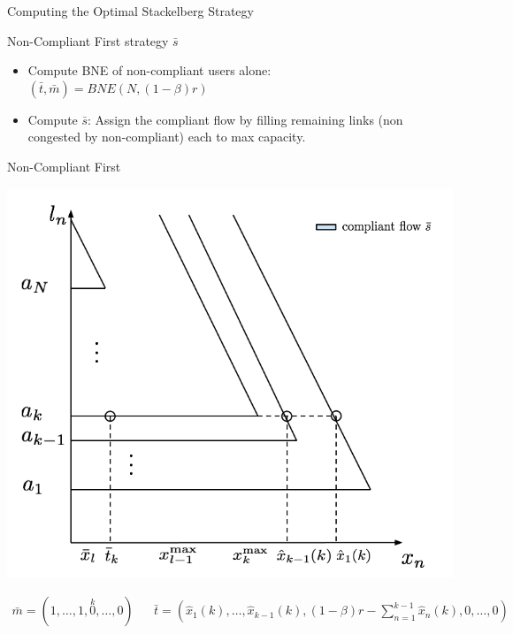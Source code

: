 \documentclass[english, smaller]{beamer}
\theoremstyle{plain}
\theoremstyle{definition}
\theoremstyle{plain}
\theoremstyle{plain}
\begin{document}
\begin{frame}{Computing the Optimal Stackelberg Strategy}

\begin{block}{Non-Compliant First strategy $\bar{s}$}
\begin{itemize}
\item \alert{Compute BNE of non-compliant users alone: $(\bar{t}, \bar{m}) = BNE(N, (1-\beta)r)$}
\item Compute $\bar{s}$: Assign the compliant flow by filling remaining links (non congested by non-compliant) each to max capacity.
\end{itemize}
\end{block}

\end{frame}



\begin{frame}{Non-Compliant First}

\begin{center}
\includegraphics[scale=0.25]{../../figures/presentation/optimal_stackelberg1.png}
\end{center}

\small
\begin{align*}
\bar{m} = (1, \dots, 1, \stackrel{k}{0}, \dots, 0) &&
\bar{t} = \left( \hat{x}_1(k), \dots, \hat{x}_{k-1}(k), (1-\beta)r - \sum_{n = 1}^{k-1}\hat{x}_n(k), 0, \dots, 0\right)
\end{align*}


\end{frame}
\end{document}

